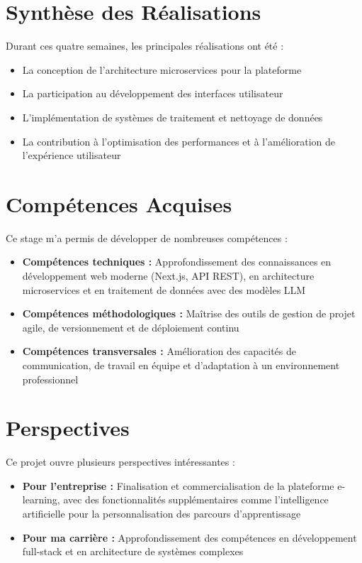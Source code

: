 \documentclass[12pt, a4paper]{report}
\begin{document}
\section{Synthèse des Réalisations}

Durant ces quatre semaines, les principales réalisations ont été :
\begin{itemize}
  \item La conception de l'architecture microservices pour la plateforme
  \item La participation au développement des interfaces utilisateur
  \item L'implémentation de systèmes de traitement et nettoyage de données
  \item La contribution à l'optimisation des performances et à l'amélioration de l'expérience utilisateur
\end{itemize}

\section{Compétences Acquises}

Ce stage m'a permis de développer de nombreuses compétences :
\begin{itemize}
  \item \textbf{Compétences techniques :} Approfondissement des connaissances en développement web moderne (Next.js, API REST), en architecture microservices et en traitement de données avec des modèles LLM
  \item \textbf{Compétences méthodologiques :} Maîtrise des outils de gestion de projet agile, de versionnement et de déploiement continu
  \item \textbf{Compétences transversales :} Amélioration des capacités de communication, de travail en équipe et d'adaptation à un environnement professionnel
\end{itemize}

\section{Perspectives}

Ce projet ouvre plusieurs perspectives intéressantes :
\begin{itemize}
  \item \textbf{Pour l'entreprise :} Finalisation et commercialisation de la plateforme e-learning, avec des fonctionnalités supplémentaires comme l'intelligence artificielle pour la personnalisation des parcours d'apprentissage
  \item \textbf{Pour ma carrière :} Approfondissement des compétences en développement full-stack et en architecture de systèmes complexes
\end{itemize}
\end{document}
